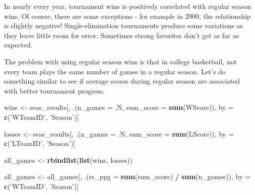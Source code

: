 \documentclass[]{article}
\newenvironment{Shaded}{\begin{snugshade}}{\end{snugshade}}
\newcommand{\KeywordTok}[1]{\textcolor[rgb]{0.13,0.29,0.53}{\textbf{#1}}}
\newcommand{\DataTypeTok}[1]{\textcolor[rgb]{0.13,0.29,0.53}{#1}}
\newcommand{\StringTok}[1]{\textcolor[rgb]{0.31,0.60,0.02}{#1}}
\newcommand{\OperatorTok}[1]{\textcolor[rgb]{0.81,0.36,0.00}{\textbf{#1}}}
\newcommand{\NormalTok}[1]{#1}
\begin{document}
In nearly every year, tournament wins is positively correlated with
regular season wins. Of course, there are some exceptions - for example
in 2000, the relationship is slightly negative! Single-elimination
tournaments produce some variations as they leave little room for error.
Sometimes strong favorites don't get as far as expected.

The problem with using regular season wins is that in college
basketball, not every team plays the same number of games in a regular
season. Let's do something similar to see if average scores during
regular season are associated with better tournament progress.

\begin{Shaded}
\begin{Highlighting}[]
\NormalTok{wins <-}\StringTok{ }\NormalTok{seas_results[, .(}\DataTypeTok{n_games =}\NormalTok{ .N, }\DataTypeTok{sum_score =} \KeywordTok{sum}\NormalTok{(WScore)), by =}\StringTok{ }\KeywordTok{c}\NormalTok{(}\StringTok{'WTeamID'}\NormalTok{, }\StringTok{'Season'}\NormalTok{)]}

\NormalTok{losses <-}\StringTok{ }\NormalTok{seas_results[, .(}\DataTypeTok{n_games =}\NormalTok{ .N, }\DataTypeTok{sum_score =} \KeywordTok{sum}\NormalTok{(LScore)), by =}\StringTok{ }\KeywordTok{c}\NormalTok{(}\StringTok{'LTeamID'}\NormalTok{, }\StringTok{'Season'}\NormalTok{)]}

\NormalTok{all_games <-}\StringTok{ }\KeywordTok{rbindlist}\NormalTok{(}\KeywordTok{list}\NormalTok{(wins, losses))}

\NormalTok{all_games <-}\StringTok{ }\NormalTok{all_games[, .(}\DataTypeTok{rs_ppg =} \KeywordTok{sum}\NormalTok{(sum_score) }\OperatorTok{/}\StringTok{ }\KeywordTok{sum}\NormalTok{(n_games)), by =}\StringTok{ }\KeywordTok{c}\NormalTok{(}\StringTok{'WTeamID'}\NormalTok{, }\StringTok{'Season'}\NormalTok{)]}
\end{Highlighting}
\end{Shaded}
\end{document}
